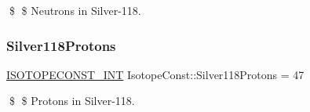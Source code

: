 \$ \$ Neutrons in Silver-\/118. \mbox{\label{group___isotope_const-_silver-_ag118_ga4256429dadde7c7f160ce1fb7ac1a530}} 
\subsubsection{\texorpdfstring{Silver118\+Protons}{Silver118Protons}}
{\footnotesize\ttfamily \mbox{\hyperlink{group___isotope_const-_macros_ga5f18360b3e99483a35c32d789e62621c}{I\+S\+O\+T\+O\+P\+E\+C\+O\+N\+S\+T\+\_\+\+I\+NT}} Isotope\+Const\+::\+Silver118\+Protons = 47}

\$ \$ Protons in Silver-\/118. 